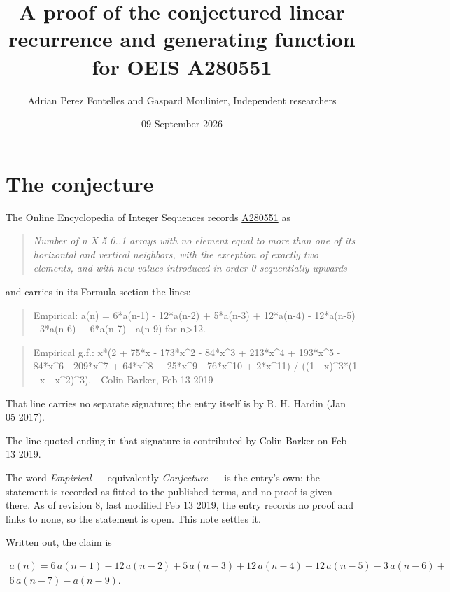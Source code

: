 \documentclass[11pt]{article}
\title{A proof of the conjectured linear recurrence and generating function for OEIS A280551}
\author{Adrian Perez Fontelles and Gaspard Moulinier, Independent researchers}
\date{09 September 2026}
\theoremstyle{definition}
\begin{document}
\maketitle
\section{The conjecture}

The Online Encyclopedia of Integer Sequences records \href{https://oeis.org/A280551}{A280551} as

\begin{quote}\itshape Number of n X 5 0..1 arrays with no element equal to more than one of its horizontal and vertical neighbors, with the exception of exactly two elements, and with new values introduced in order 0 sequentially upwards\end{quote}

and carries in its Formula section the lines:

\begin{quote}\ttfamily Empirical: a(n) = 6*a(n-1) - 12*a(n-2) + 5*a(n-3) + 12*a(n-4) - 12*a(n-5) - 3*a(n-6) + 6*a(n-7) - a(n-9) for n>12.\end{quote}

\begin{quote}\ttfamily Empirical g.f.: x*(2 + 75*x - 173*x\textasciicircum{}2 - 84*x\textasciicircum{}3 + 213*x\textasciicircum{}4 + 193*x\textasciicircum{}5 - 84*x\textasciicircum{}6 - 209*x\textasciicircum{}7 + 64*x\textasciicircum{}8 + 25*x\textasciicircum{}9 - 76*x\textasciicircum{}10 + 2*x\textasciicircum{}11) / ((1 - x)\textasciicircum{}3*(1 - x - x\textasciicircum{}2)\textasciicircum{}3). - Colin Barker, Feb 13 2019\end{quote}

That line carries no separate signature; the entry itself is by R. H. Hardin (Jan 05 2017).

The line quoted ending in that signature is contributed by Colin Barker on Feb 13 2019.

The word {\itshape Empirical} --- equivalently {\itshape Conjecture} --- is the entry's own: the statement is recorded as fitted to the published terms, and no proof is given there. As of revision 8, last modified Feb 13 2019, the entry records no proof and links to none, so the statement is open. This note settles it.

Written out, the claim is

\begin{multline*} a(n) = 6\,a(n-1) - 12\,a(n-2) + 5\,a(n-3) + 12\,a(n-4) - 12\,a(n-5) - 3\,a(n-6) + \\ 6\,a(n-7) - a(n-9). \end{multline*}
\end{document}
